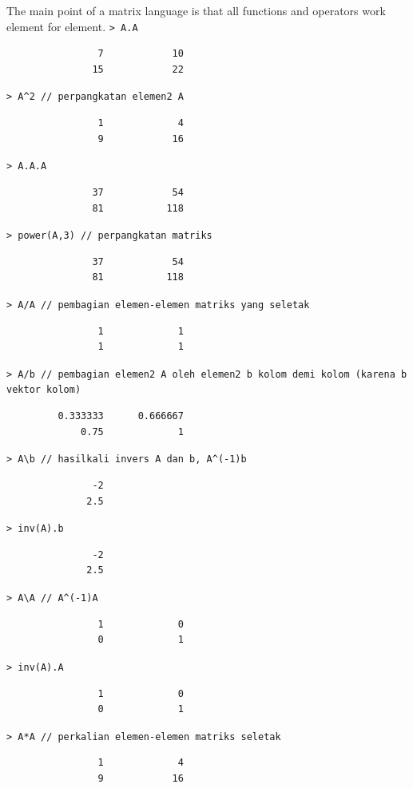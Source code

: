 \documentclass[11pt, a4paper]{article}
\newcommand{\emtcmd}[1]{\noindent\texttt{\textcolor{emtcommand}{>}\ #1}\par\smallskip}
\begin{document}
The main point of a matrix language is that all functions and operators work element for element.
\emtcmd{A.A}
\begin{verbatim}
                7            10
               15            22
\end{verbatim}
\emtcmd{A\^{}2 \textcolor{emtcomment}{// perpangkatan elemen2 A}}
\begin{verbatim}
                1             4
                9            16
\end{verbatim}
\emtcmd{A.A.A}
\begin{verbatim}
               37            54
               81           118
\end{verbatim}
\emtcmd{power(A,3) \textcolor{emtcomment}{// perpangkatan matriks}}
\begin{verbatim}
               37            54
               81           118
\end{verbatim}
\emtcmd{A/A \textcolor{emtcomment}{// pembagian elemen-elemen matriks yang seletak}}
\begin{verbatim}
                1             1
                1             1
\end{verbatim}
\emtcmd{A/b \textcolor{emtcomment}{// pembagian elemen2 A oleh elemen2 b kolom demi kolom (karena b vektor kolom)}}
\begin{verbatim}
         0.333333      0.666667
             0.75             1
\end{verbatim}
\emtcmd{A\textbackslash b \textcolor{emtcomment}{// hasilkali invers A dan b, A\^{}(-1)b}}
\begin{verbatim}
               -2
              2.5
\end{verbatim}
\emtcmd{inv(A).b}
\begin{verbatim}
               -2
              2.5
\end{verbatim}
\emtcmd{A\textbackslash A \textcolor{emtcomment}{// A\^{}(-1)A}}
\begin{verbatim}
                1             0
                0             1
\end{verbatim}
\emtcmd{inv(A).A}
\begin{verbatim}
                1             0
                0             1
\end{verbatim}
\emtcmd{A*A \textcolor{emtcomment}{// perkalian elemen-elemen matriks seletak}}
\begin{verbatim}
                1             4
                9            16
\end{verbatim}
\end{document}
